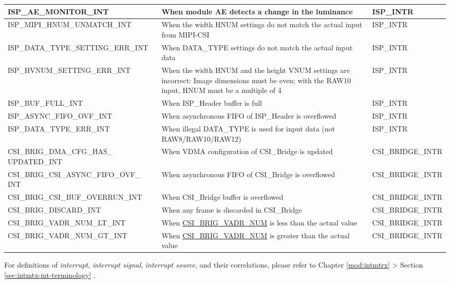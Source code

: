 \documentclass[main\_\_EN.tex]{subfiles}
\begin{document}
\begin{longtable}{ | L{5.5cm} | L{6.5cm} | L{3cm} | }
    ISP\_AE\_MONITOR\_INT & When module AE detects a change in the luminance & ISP\_INTR \\ \hline
    ISP\_MIPI\_HNUM\_UNMATCH\_INT & When the width HNUM settings do not match the actual input from MIPI-CSI & ISP\_INTR \\ \hline
    ISP\_DATA\_TYPE\_SETTING\_ERR\_INT & When DATA\_TYPE settings do not match the actual input data & ISP\_INTR \\ \hline
    ISP\_HVNUM\_SETTING\_ERR\_INT & When the width HNUM and the height VNUM settings are incorrect: Image dimensions must be even; with the RAW10 input, HNUM must be a multiple of 4 & ISP\_INTR \\ \hline
    ISP\_BUF\_FULL\_INT & When ISP\_Header buffer is full & ISP\_INTR \\ \hline
    ISP\_ASYNC\_FIFO\_OVF\_INT & When asynchronous FIFO of ISP\_Header is overflowed & ISP\_INTR \\ \hline
    ISP\_DATA\_TYPE\_ERR\_INT & When illegal DATA\_TYPE is used for input data (not RAW8/RAW10/RAW12) & ISP\_INTR \\ \hline
    CSI\_BRIG\_DMA\_CFG\_HAS\_          UPDATED\_INT & When VDMA configuration of CSI\_Bridge is updated & CSI\_BRIDGE\_INTR \\\hline
    CSI\_BRIG\_CSI\_ASYNC\_FIFO\_OVF\_  INT & When asynchronous FIFO of CSI\_Bridge is overflowed & CSI\_BRIDGE\_INTR \\\hline
    CSI\_BRIG\_CSI\_BUF\_OVERRUN\_INT & When CSI\_Bridge buffer is overflowed & CSI\_BRIDGE\_INTR \\\hline
    CSI\_BRIG\_DISCARD\_INT & When any frame is discarded in CSI\_Bridge & CSI\_BRIDGE\_INTR \\\hline
    CSI\_BRIG\_VADR\_NUM\_LT\_INT & When \hyperref[fielddesc:CSIBRIGVADRNUM]{CSI\_BRIG\_VADR\_NUM} is less than the actual value & CSI\_BRIDGE\_INTR \\\hline
    CSI\_BRIG\_VADR\_NUM\_GT\_INT & When \hyperref[fielddesc:CSIBRIGVADRNUM]{CSI\_BRIG\_VADR\_NUM} is greater than the actual value & CSI\_BRIDGE\_INTR \\\hline
\end{longtable}

\begin{tiplisting}
For definitions of \textit{interrupt}, \textit{interrupt signal}, \textit{interrupt source}, and their correlations, please refer to Chapter \ref{mod:intmtrx} \textit{} > Section \ref{sec:intmtx-int-terminology} \textit{}.
\end{tiplisting}
\end{document}
